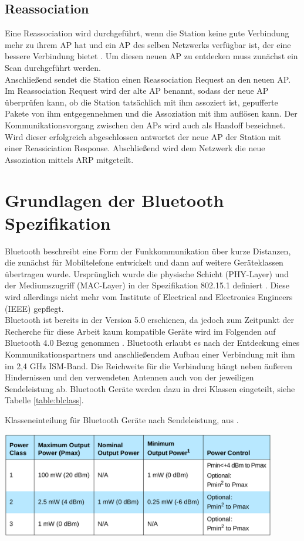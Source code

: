 \subsection{Reassociation}
Eine Reassociation wird durchgeführt, wenn die Station keine gute Verbindung mehr zu ihrem AP hat und ein AP des selben Netzwerks verfügbar ist, der eine bessere Verbindung bietet \cite{ieee2012reassociate}.
Um diesen neuen AP zu entdecken muss zunächst ein Scan durchgeführt werden. \\
Anschließend sendet die Station einen Reassociation Request an den neuen AP. 
Im Reassociation Request wird der alte AP benannt, sodass der neue AP überprüfen kann, ob die Station tatsächlich mit ihm assoziert ist, gepufferte Pakete von ihm entgegennehmen und die Assoziation mit ihm auflösen kann.
Der Kommunikationsvorgang zwischen den APs wird auch als Handoff bezeichnet. 
Wird dieser erfolgreich abgeschlossen antwortet der neue AP der Station mit einer Reassiciation Response.
Abschließend wird dem Netzwerk die neue Assoziation mittels ARP mitgeteilt.


\section{Grundlagen der Bluetooth Spezifikation}
Bluetooth beschreibt eine Form der Funkkommunikation über kurze Distanzen, die zunächst für Mobiltelefone entwickelt und dann auf weitere Geräteklassen übertragen wurde.
Ursprünglich wurde die physische Schicht (PHY-Layer) und der Mediumszugriff (MAC-Layer) in der Spezifikation 802.15.1 definiert \cite{ieee2002blue}. 
Diese wird allerdings nicht mehr vom Institute of Electrical and Electronics Engineers (IEEE) gepflegt. \\
Bluetooth ist bereits in der Version 5.0 erschienen, da jedoch zum Zeitpunkt der Recherche für diese Arbeit kaum kompatible Geräte wird im Folgenden auf Bluetooth 4.0 Bezug genommen \cite{blue2010spec}.
Bluetooth erlaubt es nach der Entdeckung eines Kommunikationspartners und anschließendem Aufbau einer Verbindung mit ihm im 2,4 GHz ISM-Band.
Die Reichweite für die Verbindung hängt neben äußeren Hindernissen und den verwendeten Antennen auch von der jeweiligen Sendeleistung ab.
Bluetooth Geräte werden dazu in drei Klassen eingeteilt, siehe Tabelle \ref{table:blclass}.

\begin{table}[h]
  \centering
	\caption{Klasseneinteilung für Bluetooth Geräte nach Sendeleistung, aus \cite{blue2010classes}.}
	\includegraphics[width=0.9\textwidth]{images/blueclasses.png}
  \label{table:blclass}
\end{table}


